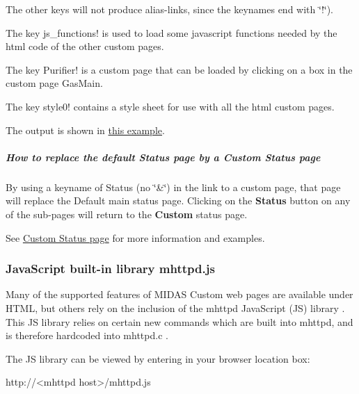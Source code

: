 The other keys will not produce alias-\/links, since the keynames end with \char`\"{}!\char`\"{}).


\begin{DoxyItemize}
\item The key js\_\-functions! is used to load some javascript functions needed by the html code of the other custom pages.
\item The key Purifier! is a custom page that can be loaded by clicking on a box in the custom page GasMain.
\item The key style0! contains a style sheet for use with all the html custom pages.
\end{DoxyItemize}

The output is shown in \hyperlink{RC_T2K_Gas_Page_T2K_example_2}{this example}.\hypertarget{RC_mhttpd_Activate_RC_odb_custom_status}{}\subparagraph{How to replace the default Status page by a Custom Status page}\label{RC_mhttpd_Activate_RC_odb_custom_status}
By using a keyname of Status (no \char`\"{}\&\char`\"{}) in the link to a custom page, that page will replace the Default main status page. Clicking on the {\bfseries Status} button on any of the sub-\/pages will return to the {\bfseries Custom} status page.

\par
 See \hyperlink{RC_mhttpd_custom_status}{Custom Status page} for more information and examples.

\par
 

\label{index_end}
\hypertarget{index_end}{}
 \subsubsection{JavaScript built-\/in library mhttpd.js}\label{RC_mhttpd_custom_js_lib}


\label{RC_mhttpd_custom_js_lib_idx_JavaScript_built-in-library}
\hypertarget{RC_mhttpd_custom_js_lib_idx_JavaScript_built-in-library}{}
 \label{RC_mhttpd_custom_js_lib_idx_mhttpd-javascript-library}
\hypertarget{RC_mhttpd_custom_js_lib_idx_mhttpd-javascript-library}{}


Many of the supported features of MIDAS Custom web pages are available under HTML, but others rely on the inclusion of the mhttpd JavaScript (JS) library . This JS library relies on certain new commands which are built into mhttpd, and is therefore hardcoded into mhttpd.c .

The JS library can be viewed by entering in your browser location box: 
\begin{DoxyCode}
http://<mhttpd host>/mhttpd.js
\end{DoxyCode}


